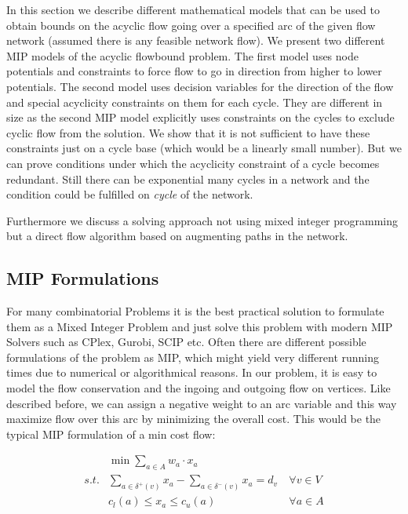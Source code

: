In this section we describe different mathematical models that can be used to obtain bounds on the acyclic flow going 
over a specified arc of the given flow network (assumed there is any feasible network flow). We present two different 
MIP models of the acyclic flowbound problem. The first model uses node potentials and constraints to force flow to 
go in direction from higher to lower potentials. The second model uses decision variables for the direction of the 
flow and special acyclicity constraints on them for each cycle. They are different in size as the second MIP model 
explicitly uses constraints on the cycles to exclude cyclic flow from the solution. We show that it is not sufficient 
to have these constraints just on a cycle base (which would be a linearly small number). But we can prove 
conditions under which the acyclicity constraint of a cycle becomes redundant. Still there can be exponential many 
cycles in a network and the condition could be fulfilled on \textit{cycle} of the network. 

Furthermore we discuss a solving approach not using mixed integer programming but a direct flow algorithm based on 
augmenting paths in the network.%



\subsection{MIP Formulations}
For many combinatorial Problems it is the best practical solution to formulate them as a Mixed Integer Problem and just 
solve this problem with modern MIP Solvers such as CPlex, Gurobi, SCIP etc. Often there are different possible 
formulations of the problem as 
MIP, which might yield very different running times due to numerical or algorithmical reasons. In our problem, it is 
easy to model the flow conservation and the ingoing and outgoing flow on vertices. Like described before, we can assign 
a negative weight to an arc variable and this way maximize flow over this arc by minimizing the overall cost. This 
would be the typical MIP formulation of a min cost flow:

\begin{align*}
  &\min \sum_{a\in A} w_a\cdot x_a  \\
 s.t. & \sum_{a\in \delta^+(v)}x_a - \sum_{a\in\delta^- (v)}x_a = d_v\ &\forall v\in V \\
  & c_l(a)\le x_a \le c_u(a) & \forall a\in A
\end{align*}

